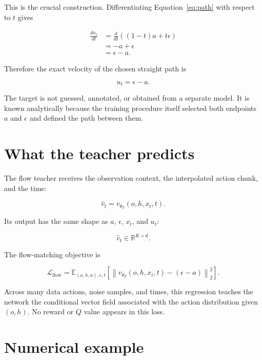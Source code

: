 \documentclass[11pt]{article}
\newcommand{\E}{\mathbb{E}}
\newcommand{\Lflow}{\mathcal{L}_{\mathrm{flow}}}
\begin{document}
This is the crucial construction.  Differentiating
Equation~\eqref{eq:path} with respect to $t$ gives

\begin{align}
    \frac{d x_t}{dt}
    &=\frac{d}{dt}\left((1-t)a+t\epsilon\right)
    \\
    &=-a+\epsilon
    \\
    &=\epsilon-a.
\end{align}

Therefore the exact velocity of the chosen straight path is

\begin{equation}
    \boxed{u_t=\epsilon-a.}
\end{equation}

The target is not guessed, annotated, or obtained from a separate model.  It
is known analytically because the training procedure itself selected both
endpoints $a$ and $\epsilon$ and defined the path between them.

\section{What the teacher predicts}

The flow teacher receives the observation context, the interpolated action
chunk, and the time:

\begin{equation}
    \widehat{v}_t
    =v_{\theta_T}(o,h,x_t,t).
\end{equation}

Its output has the same shape as $a$, $\epsilon$, $x_t$, and $u_t$:

\begin{equation}
    \widehat{v}_t\in\mathbb{R}^{K\times d}.
\end{equation}

The flow-matching objective is

\begin{equation}
    \boxed{
    \Lflow
    =\E_{(o,h,a),\epsilon,t}
      \left[
      \left\|
      v_{\theta_T}(o,h,x_t,t)-(\epsilon-a)
      \right\|_2^2
      \right].
    }
\end{equation}

Across many data actions, noise samples, and times, this regression teaches
the network the conditional vector field associated with the action
distribution given $(o,h)$.  No reward or $Q$ value appears in this loss.

\section{Numerical example}
\end{document}
